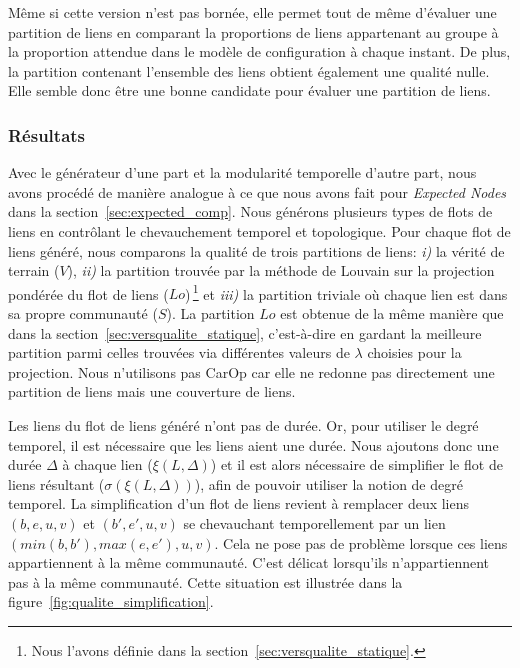  

Même si cette version n'est pas bornée, elle permet tout de même d'évaluer une partition de liens en comparant la proportions de liens appartenant au groupe à la proportion attendue dans le modèle de configuration à chaque instant.
De plus, la partition contenant l'ensemble des liens obtient également une qualité nulle.
Elle semble donc être une bonne candidate pour évaluer une partition de liens.

\subsubsection{Résultats}

Avec le générateur d'une part et la modularité temporelle d'autre part, nous avons procédé de manière analogue à ce que nous avons fait pour \emph{Expected Nodes} dans la section~\ref{sec:expected_comp}.
Nous générons plusieurs types de flots de liens en contrôlant le chevauchement temporel et topologique.
Pour chaque flot de liens généré, nous comparons la qualité de trois partitions de liens: \emph{i)} la vérité de terrain ($V$), \emph{ii)} la partition trouvée par la méthode de Louvain sur la projection pondérée du flot de liens ($Lo$)\,\footnote{Nous l'avons définie dans la section~\ref{sec:versqualite_statique}.} et \emph{iii)} la partition triviale où chaque lien est dans sa propre communauté ($S$).
La partition $Lo$ est obtenue de la même manière que dans la section~\ref{sec:versqualite_statique}, c'est-à-dire en gardant la meilleure partition parmi celles trouvées via différentes valeurs de $\lambda$ choisies pour la projection.
Nous n'utilisons pas CarOp car elle ne redonne pas directement une partition de liens mais une couverture de liens.

Les liens du flot de liens généré n'ont pas de durée.
Or, pour utiliser le degré temporel, il est nécessaire que les liens aient une durée.
Nous ajoutons donc une durée $\Delta$ à chaque lien ($\xi(L,\Delta)$) et il est alors nécessaire de simplifier le flot de liens résultant ($\sigma(\xi(L,\Delta))$), afin de pouvoir utiliser la notion de degré temporel.
La simplification d'un flot de liens revient à remplacer deux liens $(b,e,u,v)$ et $(b',e',u,v)$ se chevauchant temporellement par un lien $(min(b,b'),max(e,e'),u,v)$.
Cela ne pose pas de problème lorsque ces liens appartiennent à la même communauté.
C'est délicat lorsqu'ils n'appartiennent pas à la même communauté.
Cette situation est illustrée dans la figure~\ref{fig:qualite_simplification}.

